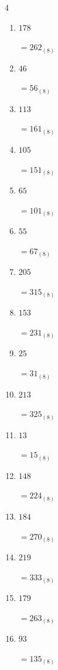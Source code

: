 \begin{multicols}{4}
\begin{enumerate}
  \item $178$

        $=262_{(8)}$

  \item $46$

        $=56_{(8)}$

\columnbreak %

\resetques

  \item $113$

        $=161_{(8)}$

  \item $105$

        $=151_{(8)}$

  \item $65$

        $=101_{(8)}$

  \item $55$

        $=67_{(8)}$

  \item $205$

        $=315_{(8)}$

  \item $153$

        $=231_{(8)}$

  \item $25$

        $=31_{(8)}$

  \item $213$

        $=325_{(8)}$

  \item $13$

        $=15_{(8)}$

  \item $148$

        $=224_{(8)}$

  \item $184$

        $=270_{(8)}$

  \item $219$

        $=333_{(8)}$

  \item $179$

        $=263_{(8)}$

  \item $93$

        $=135_{(8)}$


\end{enumerate}
\end{multicols}

